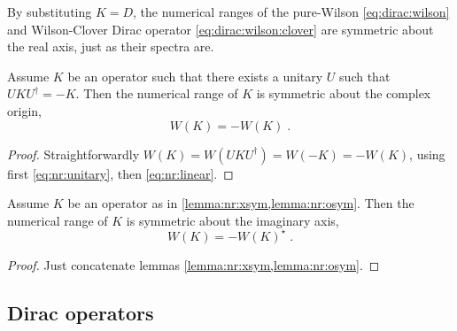 By substituting $K=D$, the numerical ranges of the pure-Wilson \cref{eq:dirac:wilson} and Wilson-Clover Dirac operator \cref{eq:dirac:wilson:clover} are symmetric about the real axis, just as their spectra are.

\begin{lemma} \label{lemma:nr:osym}
Assume $K$ be an operator such that there exists a unitary $U$ such that $U K U^{\dagger} = -K$.
Then the numerical range of $K$ is symmetric about the complex origin,
\begin{equation}
W(K) = - W(K) \;.
\end{equation}
\end{lemma}

\begin{proof}
Straightforwardly $W(K) = W(U K U^{\dagger}) = W(-K) = -W(K)$, using first \cref{eq:nr:unitary}, then \cref{eq:nr:linear}.
\end{proof}

\begin{corollary} \label{lemma:nr:ysym}
Assume $K$ be an operator as in \cref{lemma:nr:xsym,lemma:nr:osym}.
Then the numerical range of $K$ is symmetric about the imaginary axis,
\begin{equation}
W(K) = - W(K)^{\star} \;.
\end{equation}
\end{corollary}

\begin{proof}
Just concatenate lemmas \cref{lemma:nr:xsym,lemma:nr:osym}.
\end{proof}

\subsection{Dirac operators}

